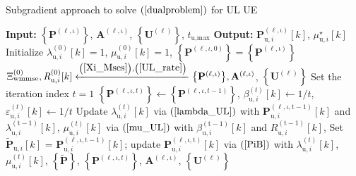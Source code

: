 \documentclass[10pt,journal]{IEEEtran}
\newcommand{\paren}[1]{\left({#1}\right)}
\newcommand{\bracket}[1]{{\left [{#1}\right ]}}
\newcommand{\braces}[1]{{\left\{ {#1}\right\}}}
\newcommand{\sfrac}[2]{#1/#2}
\theoremstyle{definition}
\begin{document}
		\begin{algorithm}[ht!]
			\par\noindent\small
			\caption{Subgradient approach to solve $\paren{\ref{dualproblem}}$ for UL UE}
			\label{ULalgorithm}
			\begin{algorithmic}[1]
				\Statex \textbf{Input: } $\braces{\mathbf{P}^{\paren{\mathrm{\ell,\iota}}}}$,  $\mathbf{A}^{\paren{\mathrm{\ell,\iota}}}$, $\braces{\mathbf{U}^{\paren{\mathrm{\ell}}}}$, $t_{\textrm{u,max}}$
				\Statex \textbf{Output:} $\mathbf{P}^{\paren{\mathrm{\ell,\iota}}}_{\textrm{u},i}\bracket{k}$, $\mu^\star_{\textrm{u},i}\bracket{k}$
				\State Initialize $\lambda^{\paren{\mathrm{0}}}_{\textrm{u},i}\bracket{k}=1$, $\mu^{\paren{\mathrm{0}}}_{\textrm{u},i}\bracket{k}=1$, $\braces{\mathbf{P}^{\paren{\ell,\iota,0}}}=\braces{\mathbf{P}^{\paren{\mathrm{\ell,\iota}}}}$ 
				\State $\Xi^{\paren{\mathrm{0}}}_{\textrm{wmmse}},\mathit{R}^{\paren{\mathrm{0}}}_{\textrm{u},i}\bracket{k}\xleftarrow{\paren{\mathrm{\ref{Xi_Mses}}},\paren{\mathrm{\ref{UL_rate}}}}\braces{\mathbf{P}^{\paren{\mathrm{\ell,\iota}}}},\mathbf{A}^{\paren{\mathrm{\ell,\iota}}}$, $\braces{\mathbf{U}^{\paren{\mathrm{\ell}}}}$
				\State Set the iteration index $t=1$
				\Repeat
				\State $\braces{\mathbf{P}^{\paren{\ell,\iota,t}}}\leftarrow\braces{\mathbf{P}^{\paren{\ell,\iota,t-1}}}$, $\beta^{\paren{t}}_{\textrm{u},i}\bracket{k}\leftarrow\sfrac{1}{t}$, $\varepsilon^{\paren{t}}_{\textrm{u},i}\bracket{k}\leftarrow\sfrac{1}{t}$
				\State Update $\lambda^{\paren{t}}_{\textrm{u},i}\bracket{k}$ via $\mathrm{\paren{\ref{lambda_UL}}}$ with $\mathbf{P}^{\paren{\mathrm{\ell,\iota,t-1}}}_{\textrm{u},i}\bracket{k}$ and $\lambda^{\paren{\mathrm{t-1}}}_{\textrm{u},i}\bracket{k}$, $\mu^{\paren{t}}_{\textrm{u},i}\bracket{k}$ via $\mathrm{\paren{\ref{mu_UL}}}$ with $\beta^{\paren{\mathrm{t-1}}}_{\textrm{u},i}\bracket{k}$ and $\mathit{R}^{\paren{\mathrm{t-1}}}_{\textrm{u},i}\bracket{k}$, 
				\State Set $\widetilde{\mathbf{P}}_{\textrm{u},i}\bracket{k}$ = $\mathbf{P}^{\paren{\mathrm{\ell,\iota,t-1}}}_{\textrm{u},i}\bracket{k}$; update $\mathbf{P}^{\paren{\mathrm{\ell,\iota,t}}}_{\textrm{u},i}\bracket{k}$ via $\mathrm{\paren{\ref{PiB}}}$ with $\lambda^{\paren{t}}_{\textrm{u},i}\bracket{k}$, $\mu^{\paren{t}}_{\textrm{u},i}\bracket{k}$, $\braces{\widetilde{\mathbf{P}}}$, $\braces{\mathbf{P}^{\paren{\ell,\iota,t}}}$, $\mathbf{A}^{\paren{\mathrm{\ell,\iota}}}$, $\braces{\mathbf{U}^{\paren{\mathrm{\ell}}}}$

\end{algorithmic}
\end{algorithm}
\end{document}
